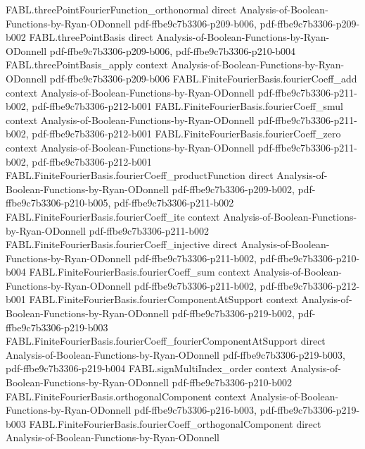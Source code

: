 \begin{theorem}
\proofstep
  {FABL.threePointFourierFunction_orthonormal}
  {direct}
  {Analysis-of-Boolean-Functions-by-Ryan-ODonnell}
  {pdf-ffbe9c7b3306-p209-b006,
    pdf-ffbe9c7b3306-p209-b002}
\proofstep
  {FABL.threePointBasis}
  {direct}
  {Analysis-of-Boolean-Functions-by-Ryan-ODonnell}
  {pdf-ffbe9c7b3306-p209-b006,
    pdf-ffbe9c7b3306-p210-b004}
\proofstep
  {FABL.threePointBasis_apply}
  {context}
  {Analysis-of-Boolean-Functions-by-Ryan-ODonnell}
  {pdf-ffbe9c7b3306-p209-b006}
\proofstep
  {FABL.FiniteFourierBasis.fourierCoeff_add}
  {context}
  {Analysis-of-Boolean-Functions-by-Ryan-ODonnell}
  {pdf-ffbe9c7b3306-p211-b002,
    pdf-ffbe9c7b3306-p212-b001}
\proofstep
  {FABL.FiniteFourierBasis.fourierCoeff_smul}
  {context}
  {Analysis-of-Boolean-Functions-by-Ryan-ODonnell}
  {pdf-ffbe9c7b3306-p211-b002,
    pdf-ffbe9c7b3306-p212-b001}
\proofstep
  {FABL.FiniteFourierBasis.fourierCoeff_zero}
  {context}
  {Analysis-of-Boolean-Functions-by-Ryan-ODonnell}
  {pdf-ffbe9c7b3306-p211-b002,
    pdf-ffbe9c7b3306-p212-b001}
\proofstep
  {FABL.FiniteFourierBasis.fourierCoeff_productFunction}
  {direct}
  {Analysis-of-Boolean-Functions-by-Ryan-ODonnell}
  {pdf-ffbe9c7b3306-p209-b002,
    pdf-ffbe9c7b3306-p210-b005,
    pdf-ffbe9c7b3306-p211-b002}
\proofstep
  {FABL.FiniteFourierBasis.fourierCoeff_ite}
  {context}
  {Analysis-of-Boolean-Functions-by-Ryan-ODonnell}
  {pdf-ffbe9c7b3306-p211-b002}
\proofstep
  {FABL.FiniteFourierBasis.fourierCoeff_injective}
  {direct}
  {Analysis-of-Boolean-Functions-by-Ryan-ODonnell}
  {pdf-ffbe9c7b3306-p211-b002,
    pdf-ffbe9c7b3306-p210-b004}
\proofstep
  {FABL.FiniteFourierBasis.fourierCoeff_sum}
  {context}
  {Analysis-of-Boolean-Functions-by-Ryan-ODonnell}
  {pdf-ffbe9c7b3306-p211-b002,
    pdf-ffbe9c7b3306-p212-b001}
\proofstep
  {FABL.FiniteFourierBasis.fourierComponentAtSupport}
  {context}
  {Analysis-of-Boolean-Functions-by-Ryan-ODonnell}
  {pdf-ffbe9c7b3306-p219-b002,
    pdf-ffbe9c7b3306-p219-b003}
\proofstep
  {FABL.FiniteFourierBasis.fourierCoeff_fourierComponentAtSupport}
  {direct}
  {Analysis-of-Boolean-Functions-by-Ryan-ODonnell}
  {pdf-ffbe9c7b3306-p219-b003,
    pdf-ffbe9c7b3306-p219-b004}
\proofstep
  {FABL.signMultiIndex_order}
  {context}
  {Analysis-of-Boolean-Functions-by-Ryan-ODonnell}
  {pdf-ffbe9c7b3306-p210-b002}
\proofstep
  {FABL.FiniteFourierBasis.orthogonalComponent}
  {context}
  {Analysis-of-Boolean-Functions-by-Ryan-ODonnell}
  {pdf-ffbe9c7b3306-p216-b003,
    pdf-ffbe9c7b3306-p219-b003}
\proofstep
  {FABL.FiniteFourierBasis.fourierCoeff_orthogonalComponent}
  {direct}
  {Analysis-of-Boolean-Functions-by-Ryan-ODonnell}

\end{theorem}
